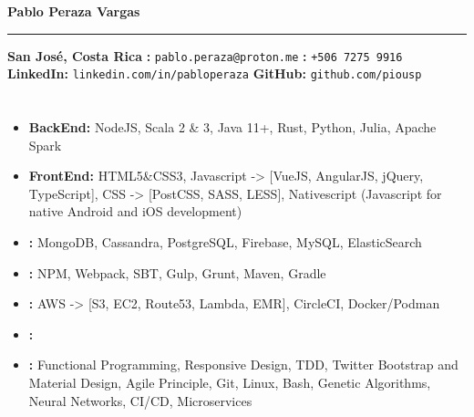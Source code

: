 \documentclass[a4paper,10pt]{article}
\begin{document}
\begin{center}
    {\Huge \textbf{\textcolor{primary}{Pablo Peraza Vargas}}}
    \par\noindent\rule{\textwidth}{1pt}
    \vspace{5pt}
    \textbf{\textcolor{secondary}{San José, Costa Rica}} \quad
    \textbf{\textcolor{secondary}{\correo:}} \texttt{pablo.peraza@proton.me} \quad
    \textbf{\textcolor{secondary}{\tel:}} \texttt{+506 7275 9916} \\
    \textbf{\textcolor{secondary}{LinkedIn:}} \texttt{linkedin.com/in/pabloperaza} \quad
    \textbf{\textcolor{secondary}{GitHub:}} \texttt{github.com/piousp}
\end{center}

\section*{\textcolor{primary}{\resumen}}
\resumenTexto

\subsection*{\textcolor{primary}{\techSkills}}
\begin{itemize}
    \item \textbf{BackEnd:} NodeJS, Scala 2 \& 3, Java 11+, Rust, Python, Julia, Apache Spark
    \item \textbf{FrontEnd:} HTML5\&CSS3, Javascript -> [VueJS, AngularJS, jQuery, TypeScript],
     CSS -> [PostCSS, SASS, LESS], Nativescript (Javascript for native Android and iOS development)
    \item \textbf{\databases:} MongoDB, Cassandra, PostgreSQL, Firebase, MySQL, ElasticSearch
    \item \textbf{\buildtools:} NPM, Webpack, SBT, Gulp, Grunt, Maven, Gradle
    \item \textbf{\env:} AWS -> [S3, EC2, Route53, Lambda, EMR], CircleCI, Docker/Podman
    \item \textbf{\lenguage:} \lengText
    \item \textbf{\other:} Functional Programming, Responsive Design, TDD, 
    Twitter Bootstrap and Material Design, Agile Principle, Git, 
    Linux, Bash, Genetic Algorithms, Neural Networks, CI/CD, Microservices
\end{itemize}

\section*{\textcolor{primary}{\exp}}
\end{document}
